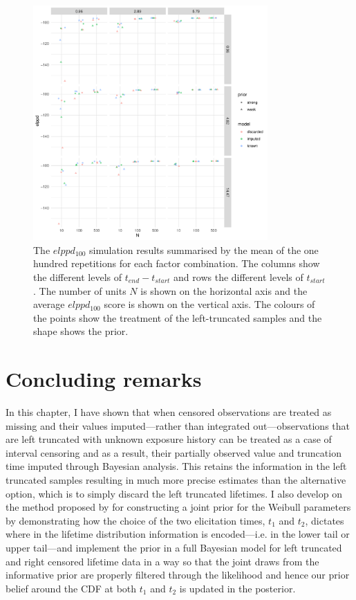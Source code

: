 \begin{figure}
    \centering
    \includegraphics[width=0.8\textwidth]{./figures/ch-2/sim-results-elppd.pdf}
    \caption{The $elppd_{100}$ simulation results summarised by the mean of the one hundred repetitions for each factor combination. The columns show the different levels of $t_{end} - t_{start}$ and rows the different levels of $t_{start}$. The number of units $N$ is shown on the horizontal axis and the average $elppd_{100}$ score is shown on the vertical axis. The colours of the points show the treatment of the left-truncated samples and the shape shows the prior.}
    \label{fig:sim-study-elppd}
\end{figure}

\section{Concluding remarks} \label{sec:weibull-conclusion}

In this chapter, I have shown that when censored observations are treated as missing and their values imputed---rather than integrated out---observations that are left truncated with unknown exposure history can be treated as a case of interval censoring and as a result, their partially observed value and truncation time imputed through Bayesian analysis. This retains the information in the left truncated samples resulting in much more precise estimates than the alternative option, which is to simply discard the left truncated lifetimes. I also develop on the method proposed by \citet{kaminskiy2005} for constructing a joint prior for the Weibull parameters by demonstrating how the choice of the two elicitation times, $t_1$ and $t_2$, dictates where in the lifetime distribution information is encoded---i.e. in the lower tail or upper tail---and implement the prior in a full Bayesian model for left truncated and right censored lifetime data in a way so that the joint draws from the informative prior are properly filtered through the likelihood and hence our prior belief around the CDF at both $t_1$ and $t_2$ is updated in the posterior.

